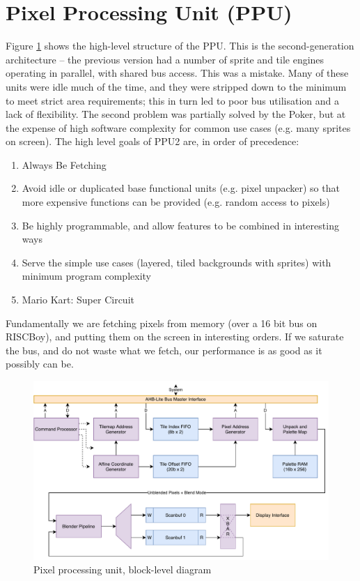 \section{Pixel Processing Unit (PPU)}

Figure \ref{diagram:ppu_block} shows the high-level structure of the PPU. This is the second-generation architecture -- the previous version had a number of sprite and tile engines operating in parallel, with shared bus access. This was a mistake. Many of these units were idle much of the time, and they were stripped down to the minimum to meet strict area requirements; this in turn led to poor bus utilisation and a lack of flexibility. The second problem was partially solved by the Poker, but at the expense of high software complexity for common use cases (e.g. many sprites on screen). The high level goals of PPU2 are, in order of precedence:

\begin{enumerate}
\item Always Be Fetching
\item Avoid idle or duplicated base functional units (e.g. pixel unpacker) so that more expensive functions can be provided (e.g. random access to pixels)
\item Be highly programmable, and allow features to be combined in interesting ways
\item Serve the simple use cases (layered, tiled backgrounds with sprites) with minimum program complexity
\item Mario Kart: Super Circuit
\end{enumerate}

Fundamentally we are fetching pixels from memory (over a 16 bit bus on RISCBoy), and putting them on the screen in interesting orders. If we saturate the bus, and do not waste what we fetch, our performance is as good as it possibly can be.

\begin{figure}[H]
\centering
\caption{Pixel processing unit, block-level diagram}
\label{diagram:ppu_block}
\includegraphics[width=\textwidth]{diagrams/ppu_block.pdf}
\end{figure}

